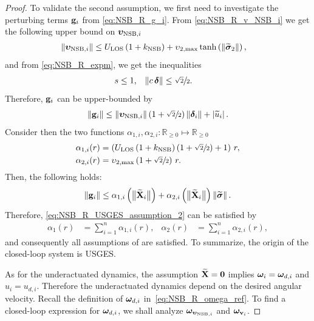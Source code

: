 \begin{proof}
    To validate the second assumption, we first need to investigate the perturbing terms $\mathbf{g}_i$ from \eqref{eq:NSB_R_g_i}.
    From \eqref{eq:NSB_R_v_NSB_i} we get the following upper bound on $\bm{\upsilon}_{{\rm NSB}, i}$ 
    \begin{align}
        \left\|\bm{\upsilon}_{{\rm NSB}, i}\right\| &\leq U_{\rm LOS}\left(1 + k_{\rm NSB}\right) + \upsilon_{2, \max}\tanh\left(\left\|\widetilde{\bm{\sigma}}_2\right\|\right),
    \end{align}
    and from \eqref{eq:NSB_R_expm}, we get the inequalities 
    \begin{align}
        s &\leq 1, &
        \left\|c\,\bm{\delta}\right\| &\leq \sfrac{\sqrt{2}}{2}.
    \end{align}
    Therefore, $\mathbf{g}_i$ can be upper-bounded by 
    \begin{equation}
        \left\|\mathbf{g}_i\right\| \leq \left\|\bm{\upsilon}_{{\rm NSB}, i}\right\|\left(1 + \sfrac{\sqrt{2}}{2}\right)\left\|\bm{\delta}_i\right\| + \left|\widetilde{u}_i\right|.
    \end{equation}
    Consider then the two functions $\alpha_{1,i}, \alpha_{2,i} : \mathbb{R}_{\geq 0} \mapsto \mathbb{R}_{\geq 0}$ 
    \begin{align}
        \alpha_{1,i}(r) &= \left(U_{\rm LOS}\left(1 + k_{\rm NSB}\right)\left(1 + \sfrac{\sqrt{2}}{2}\right) + 1\right)\,r, \\
        \alpha_{2,i}(r) &= \upsilon_{2, \max}\left(1 + \sfrac{\sqrt{2}}{2}\right)\,r.
    \end{align}
    Then, the following holds: 
    \begin{equation}
        \left\|\mathbf{g}_i\right\| \leq \alpha_{1,i}\left(\bigl\|\widetilde{\mathbf{X}}_i\bigr\|\right) + 
                            \alpha_{2,i}\left(\bigl\|\widetilde{\mathbf{X}}_i\bigr\|\right)\left\|\widetilde{\bm{\sigma}}\right\|. \label{eq:NSB_R_perturbing_term}
    \end{equation}
    Therefore, \eqref{eq:NSB_R_USGES_assumption_2} can be satisfied by 
    \begin{align}
        \alpha_1(r) &= \sum_{i=1}^n \alpha_{1,i}(r), &
        \alpha_2(r) &= \sum_{i=1}^n \alpha_{2,i}(r),
    \end{align}
    and consequently all assumptions of \cite[Proposition~9]{pettersen_lyapunov_2017} are satisfied. To summarize, the origin of the closed-loop system is USGES.

    

    As for the underactuated dynamics, the assumption $\widetilde{\mathbf{X}} = \mathbf{0}$ implies $\bm{\omega}_i = \bm{\omega}_{d, i}$ and $u_i = u_{d, i}$.
    Therefore the underactuated dynamics depend on the desired angular velocity.
    Recall the definition of $\bm{\omega}_{d, i}$ in~\eqref{eq:NSB_R_omega_ref}.
    To find a closed-loop expression for $\bm{\omega}_{d, i}$, we shall analyze $\bm{\omega}_{\bm{\upsilon}_{{\rm NSB}, i}}$ and $\bm{\omega}_{\mathbf{v}_{i}}$.


\end{proof}
